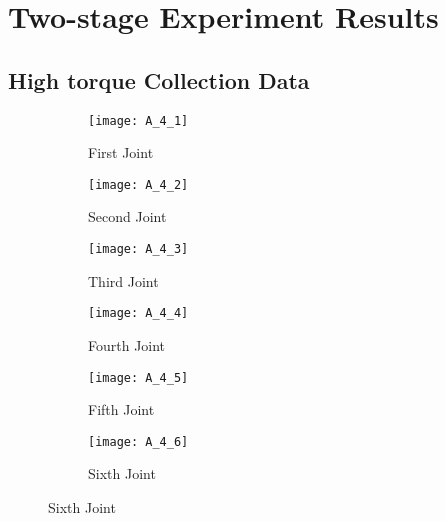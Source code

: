 \renewcommand{\thefigure}{A.\arabic{figure}}
\setcounter{figure}{0}  
\newpage

\section*{Two-stage Experiment Results}
\subsection*{High torque Collection Data}
\begin{figure}[H]
  \caption{Denso torque during high torque experiment}
  \begin{subfigure}[t]{0.5\textwidth}
    \centering
    \texttt{[image: A\_4\_1]} 
    \caption{First Joint}
  \end{subfigure}
  \begin{subfigure}[t]{0.5\textwidth}
    \centering
    \texttt{[image: A\_4\_2]}
    \caption{Second Joint}
  \end{subfigure}
  \begin{subfigure}[t]{0.5\textwidth}
    \centering
    \texttt{[image: A\_4\_3]}
    \caption{Third Joint}
  \end{subfigure}
  \begin{subfigure}[t]{0.5\textwidth}
    \centering
    \texttt{[image: A\_4\_4]}
    \caption{Fourth Joint}
  \end{subfigure}
  \begin{subfigure}[t]{0.5\textwidth}
    \centering
    \texttt{[image: A\_4\_5]}
    \caption{Fifth Joint}
  \end{subfigure}
  \begin{subfigure}[t]{0.5\textwidth}
    \centering
    \texttt{[image: A\_4\_6]}
    \caption{Sixth Joint}
  \end{subfigure}
\end{figure}

